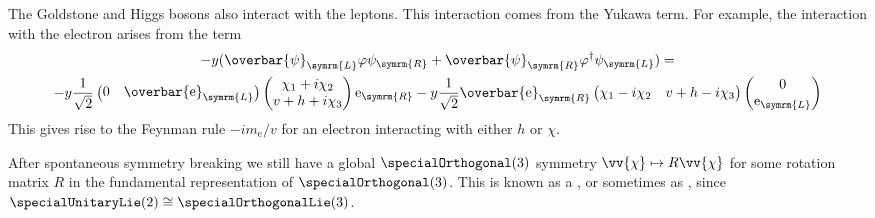 \documentclass[fleqn]{NotesClass}
\newcommand{\Pparticle}[1]{\mathrm{#1}}
\newcommand{\Pex}{\ensuremath{\Pparticle{e}}}
\newcommand{\diracadjoint}[1]{\overbar{#1}}
\newcommand{\hermit}{\dagger}
\newcommand{\Left}{\symrm{L}}
\newcommand{\Right}{\symrm{R}}
\newcommand{\isomorphic}{\cong}
\begin{document}
    The Goldstone and Higgs bosons also interact with the leptons.
    This interaction comes from the Yukawa term.
    For example, the interaction with the electron arises from the term
    \begin{multline*}
        -y(\diracadjoint{\psi}_{\Left}\varphi\psi_{\Right} + \diracadjoint{\psi}_{\Right}\varphi^\hermit\psi_{\Left}) =\\
        -y \frac{1}{\sqrt{2}}
        \begin{pmatrix}
            0 & \diracadjoint{\Pex}_{\Left}
        \end{pmatrix}
        \begin{pmatrix}
            \chi_1 + i\chi_2\\
            v + h + i\chi_3
        \end{pmatrix}
        \Pex_{\Right}
        - y\frac{1}{\sqrt{2}}\diracadjoint{\Pex}_{\Right}
        \begin{pmatrix}
            \chi_1 - i\chi_2 & v + h - i\chi_3
        \end{pmatrix}
        \begin{pmatrix}
            0\\ \Pex_{\Left}
        \end{pmatrix}
    \end{multline*}
    This gives rise to the Feynman rule \(-im_{\Pex}/v\) for an electron interacting with either \(h\) or \(\chi\).
    
    After spontaneous symmetry breaking we still have a global \(\specialOrthogonal(3)\) symmetry \(\vv{\chi} \mapsto R \vv{\chi}\) for some rotation matrix \(R\) in the fundamental representation of \(\specialOrthogonal(3)\).
    This is known as a , or sometimes as , since \(\specialUnitaryLie(2) \isomorphic \specialOrthogonalLie(3)\).
    
\end{document}
